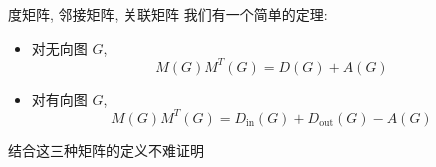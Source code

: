 \begin{frame}[fragile]{度矩阵, 邻接矩阵, 关联矩阵}
	我们有一个简单的定理:

	\begin{theorem}
		\begin{itemize}
			\item 对无向图 \(G\),
			      \[
				      M(G)M^T(G)=D(G)+A(G)
			      \]
			\item 对有向图 \(G\),
			      \[
				      M(G)M^T(G)=D_{\text{in}}(G)+D_{\text{out}}(G)-A(G)
			      \]
		\end{itemize}
	\end{theorem}

	结合这三种矩阵的定义不难证明
\end{frame}
